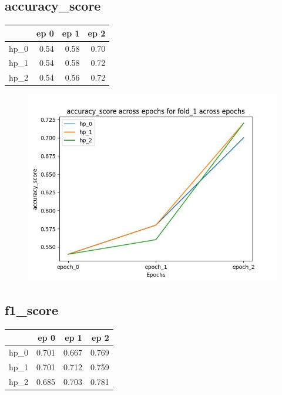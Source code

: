 \documentclass{article}
\begin{document}
\subsection{accuracy\_score}
\begin{tabular}{lrrr}
\toprule
{} &  ep 0 &  ep 1 &  ep 2 \\
\midrule
hp\_0 &  0.54 &  0.58 &  0.70 \\
hp\_1 &  0.54 &  0.58 &  0.72 \\
hp\_2 &  0.54 &  0.56 &  0.72 \\
\bottomrule
\end{tabular}

\begin{figure}[H]
\includegraphics[scale = 0.75]{fold_1/accuracy_score}
\end{figure}
\subsection{f1\_score}
\begin{tabular}{lrrr}
\toprule
{} &   ep 0 &   ep 1 &   ep 2 \\
\midrule
hp\_0 &  0.701 &  0.667 &  0.769 \\
hp\_1 &  0.701 &  0.712 &  0.759 \\
hp\_2 &  0.685 &  0.703 &  0.781 \\
\bottomrule
\end{tabular}
\end{document}
